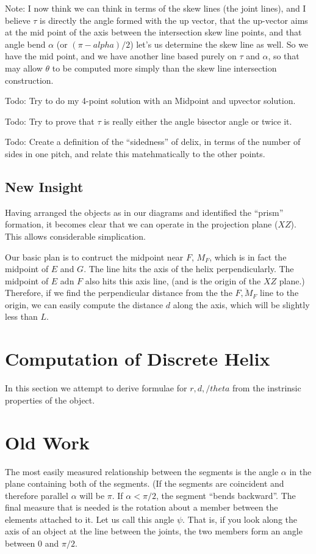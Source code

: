 \documentclass[11pt]{article}
\begin{document}
Note: I now think we can think in terms of the skew lines (the
joint lines), and I believe $\tau$ is directly the angle
formed with the up vector, that the up-vector aims at
the mid point of the axis between the intersection skew line
points, and that angle bend $\alpha$ (or $(\pi - alpha)/2$)
let's us determine the skew line as well.  So we have
the mid point, and we have another line based purely
on $\tau$ and $\alpha$, so that may allow $\theta$
to be computed more simply than the skew line intersection
construction.

Todo: Try to do my 4-point solution with an Midpoint and
upvector solution.

Todo: Try to prove that $\tau$ is really either the
angle bisector angle or twice it.

Todo: Create a definition of the ``sidedness'' of delix,
in terms of the number of sides in one pitch, and relate
this matehmatically to the other points.

\subsection{New Insight}

Having arranged the objects as in our diagrams and identified the ``prism'' formation,
it becomes clear that we can operate in the projection plane ($XZ$).
This allows considerable simplication.

Our basic plan is to contruct the midpoint near $F$, $M_F$, which is
in fact the midpoint of $E$ and $G$. The line hits the axis
of the helix perpendicularly. The midpoint of $E$ adn $F$ also
hits this axis line, (and is the origin of the $XZ$ plane.)
Therefore, if we find the perpendicular distance from the the $\overline{F,M_F}$
line to the origin, we can easily compute the distance $d$ along the axis,
which will be slightly less than $L$. 


\section{Computation of Discrete Helix}

In this section we attempt to derive formulae for $r,d,/theta$ from
the instrinsic properties of the object.

\section{Old Work}

The most easily measured relationship between the segments
is the angle $\alpha$ in the plane containing both of the segments. (If the segments are coincident and therefore
parallel $\alpha$ will be $\pi$. If $\alpha < \pi/2$, the segment ``bends backward''.
The final measure that is needed is the rotation about a member between the elements attached to it.
Let us call this angle $\psi$. That is, if you look along the axis of an object at the line
between the joints, the two members form an angle between 0 and $\pi /2$. 
\end{document}
